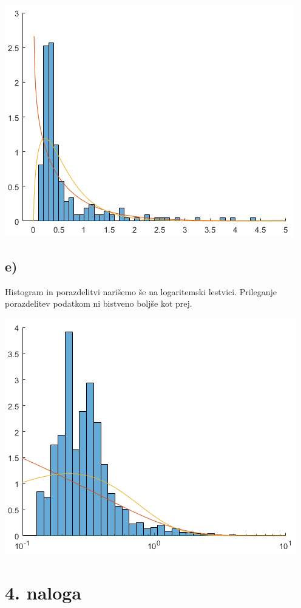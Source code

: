 \documentclass[A4paper, 11pt]{article}
\begin{document}
\includegraphics[scale=0.8]{Kiti_2}


\subsection*{e)}
Histogram in porazdelitvi narišemo še na logaritemski lestvici. Prileganje porazdelitev podatkom ni bistveno boljše kot prej.

\includegraphics[scale=0.8]{Kiti_3}



\section*{4. naloga}
\end{document}
